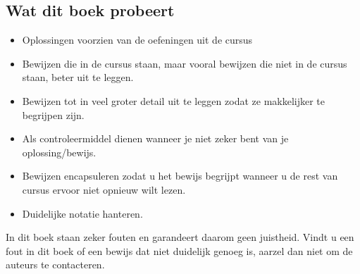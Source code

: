 \documentclass[lineaire_algebra_oplossingen.tex]{subfiles}
\begin{document}
\subsection*{Wat dit boek probeert}
\begin{itemize}
\item Oplossingen voorzien van de oefeningen uit de cursus
\item Bewijzen die in de cursus staan, maar vooral bewijzen die niet in de cursus staan, beter uit te leggen.
\item Bewijzen tot in veel groter detail uit te leggen zodat ze makkelijker te begrijpen zijn. 
\item Als controleermiddel dienen wanneer je niet zeker bent van je oplossing/bewijs.
\item Bewijzen encapsuleren zodat u het bewijs begrijpt wanneer u de rest van cursus ervoor niet opnieuw wilt lezen. 
\item Duidelijke notatie hanteren.
\end{itemize}
In dit boek staan zeker fouten en garandeert daarom geen juistheid.
Vindt u een fout in dit boek of een bewijs dat niet duidelijk genoeg is, aarzel dan niet om de auteurs te contacteren.
\end{document}
